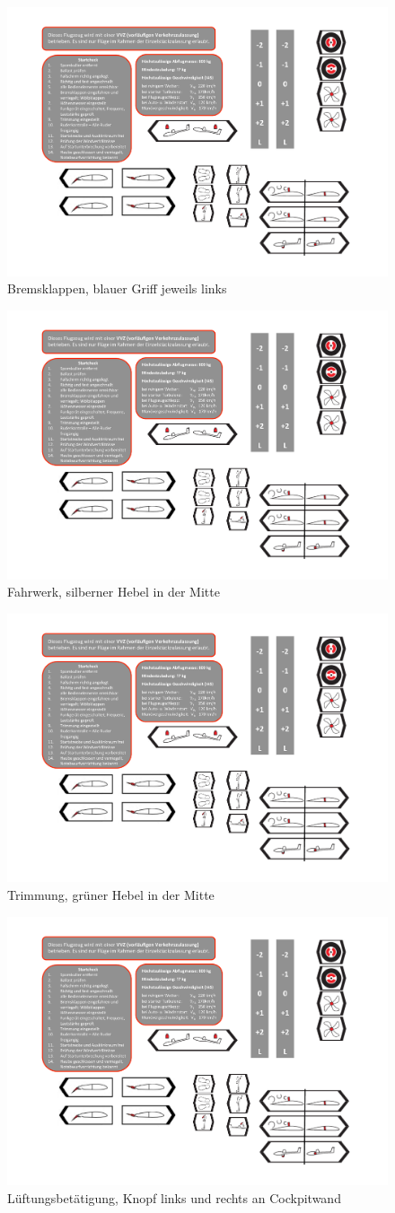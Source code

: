 \begin{figure}[H]
\begin{center}
\includegraphics[width=.45\textwidth]{bilder/bk.pdf}
\caption*{Bremsklappen, blauer Griff jeweils links}
\end{center}
\end{figure}


\begin{figure}[H]
\begin{center}
\includegraphics[width=.45\textwidth]{bilder/fahrwerk.pdf}
\caption*{Fahrwerk, silberner Hebel in der Mitte}
\end{center}
\end{figure}

\begin{figure}[H]
\begin{center}
\includegraphics[width=.45\textwidth]{bilder/trimmung.pdf}
\caption*{Trimmung, grüner Hebel in der Mitte}
\end{center}
\end{figure}

\begin{figure}[H]
\begin{center}
\includegraphics[width=.15\textwidth]{bilder/lueftung.pdf}
\caption*{Lüftungsbetätigung, Knopf links und rechts an Cockpitwand}
\end{center}
\end{figure}

